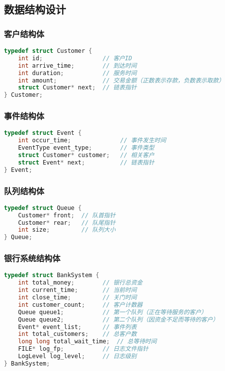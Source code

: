 \documentclass[12pt,a4paper]{article}
\begin{document}
\subsection{数据结构设计}
\subsubsection{客户结构体}
\begin{lstlisting}[language=C,caption=客户结构体]
typedef struct Customer {
    int id;                 // 客户ID
    int arrive_time;        // 到达时间
    int duration;           // 服务时间
    int amount;             // 交易金额（正数表示存款，负数表示取款）
    struct Customer* next;  // 链表指针
} Customer;
\end{lstlisting}

\subsubsection{事件结构体}
\begin{lstlisting}[language=C,caption=事件结构体]
typedef struct Event {
    int occur_time;              // 事件发生时间
    EventType event_type;        // 事件类型
    struct Customer* customer;   // 相关客户
    struct Event* next;          // 链表指针
} Event;
\end{lstlisting}

\subsubsection{队列结构体}
\begin{lstlisting}[language=C,caption=队列结构体]
typedef struct Queue {
    Customer* front;  // 队首指针
    Customer* rear;   // 队尾指针
    int size;         // 队列大小
} Queue;
\end{lstlisting}

\subsubsection{银行系统结构体}
\begin{lstlisting}[language=C,caption=银行系统结构体]
typedef struct BankSystem {
    int total_money;        // 银行总资金
    int current_time;       // 当前时间
    int close_time;         // 关门时间
    int customer_count;     // 客户计数器
    Queue queue1;           // 第一个队列（正在等待服务的客户）
    Queue queue2;           // 第二个队列（因资金不足而等待的客户）
    Event* event_list;      // 事件列表
    int total_customers;    // 总客户数
    long long total_wait_time;  // 总等待时间
    FILE* log_fp;           // 日志文件指针
    LogLevel log_level;     // 日志级别
} BankSystem;
\end{lstlisting}
\end{document}
